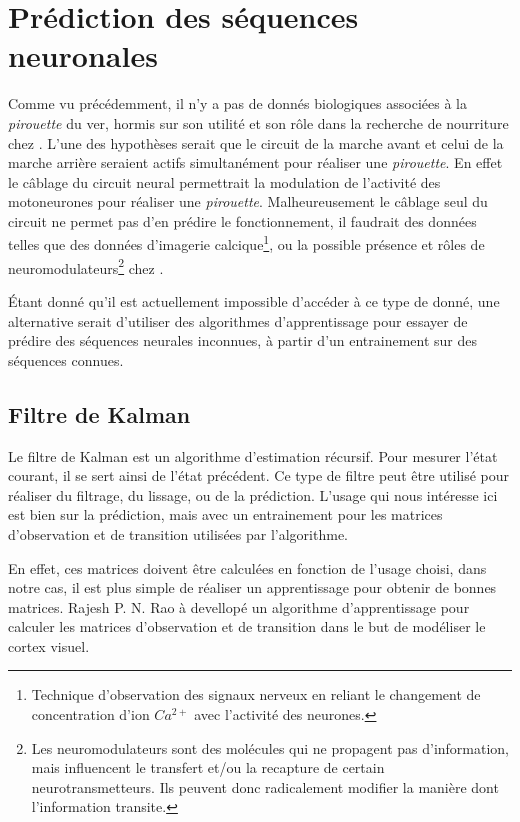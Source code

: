 \chapter{Prédiction des séquences neuronales} %
\label{cha:Prédire des séquences neuronales}

Comme vu précédemment, il n'y a pas de donnés biologiques associées à la
\textit{pirouette} du ver, hormis sur son utilité et son rôle dans la recherche
de nourriture chez \celeg{}\cite{Gray2005}. L'une des hypothèses serait que le
circuit de la marche avant et celui de la marche arrière seraient actifs
simultanément pour réaliser une \textit{pirouette}. En effet le câblage du
circuit neural permettrait la modulation de l'activité des motoneurones pour
réaliser une \textit{pirouette}. Malheureusement le câblage seul du circuit ne
permet pas d'en prédire le fonctionnement, il faudrait des données telles que
des données d'imagerie calcique\footnote{Technique d'observation des signaux
nerveux en reliant le changement de concentration d'ion $Ca^{2+}$ avec
l'activité des neurones.}, ou la possible présence et rôles de
neuromodulateurs\footnote{Les neuromodulateurs sont des molécules qui ne
propagent pas d'information, mais influencent le transfert et/ou la recapture
de certain neurotransmetteurs. Ils peuvent donc radicalement modifier la
manière dont l'information transite.} chez \celeg{}.

Étant donné qu'il est actuellement impossible d'accéder à ce type de donné, une
alternative serait d'utiliser des algorithmes d'apprentissage pour essayer de
prédire des séquences neurales inconnues, à partir d'un entrainement sur des
séquences connues.

\section{Filtre de Kalman} %
\label{sec:Filtre de Kalman}

Le filtre de Kalman est un algorithme d'estimation récursif. Pour mesurer
l'état courant, il se sert ainsi de l'état précédent. Ce type de filtre peut être
utilisé pour réaliser du filtrage, du lissage, ou de la prédiction. L'usage
qui nous intéresse ici est bien sur la prédiction, mais avec un entrainement
pour les matrices d'observation et de transition utilisées par l'algorithme.

En effet, ces matrices doivent être calculées en fonction de l'usage choisi,
dans notre cas, il est plus simple de réaliser un apprentissage pour obtenir de
bonnes matrices. Rajesh P. N. Rao à devellopé un algorithme d'apprentissage
pour calculer les matrices d'observation et de transition dans le but de modéliser
le cortex visuel\cite{Rao1999}.

